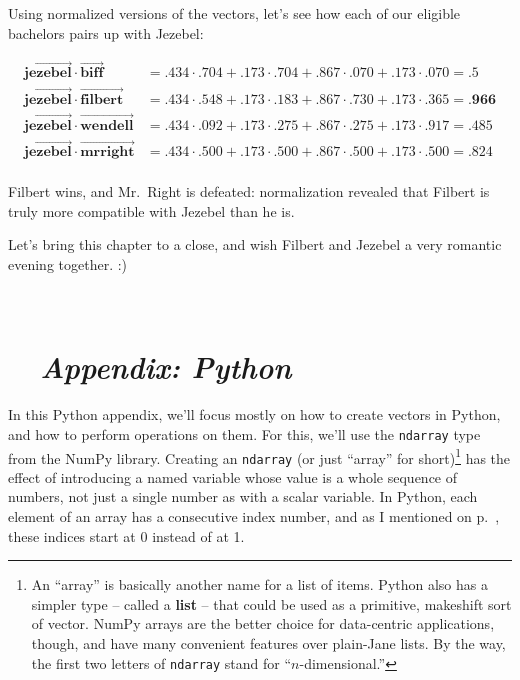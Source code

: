 Using normalized versions of the vectors, let's see how each of our eligible
bachelors pairs up with Jezebel:

\scriptsize
\begin{align*}
\overrightarrow{\textbf{jezebel}} \cdot \overrightarrow{\textbf{biff}} &=
.434 \cdot .704 + .173 \cdot .704 + .867 \cdot .070 + .173 \cdot .070 = .5 \\
\overrightarrow{\textbf{jezebel}} \cdot \overrightarrow{\textbf{filbert}} &=
.434 \cdot .548 + .173 \cdot .183 + .867 \cdot .730  + .173 \cdot .365 =
\textbf{.966} \\
\overrightarrow{\textbf{jezebel}} \cdot \overrightarrow{\textbf{wendell}} &=
.434 \cdot .092 + .173 \cdot .275 + .867 \cdot .275 + .173 \cdot .917 = .485 \\
\overrightarrow{\textbf{jezebel}} \cdot \overrightarrow{\textbf{mrright}} &=
.434 \cdot .500 + .173 \cdot .500 + .867 \cdot .500 + .173 \cdot .500 = .824 \\
\end{align*}

\normalsize
Filbert wins, and Mr.~Right is defeated: normalization revealed that
Filbert is truly more compatible with Jezebel than he is.

\label{matchmakerGameTheSystemEnd}
Let's bring this chapter to a close, and wish Filbert and Jezebel a very
romantic evening together. :)

\hrulefill \\

\vfil\pagebreak

\section*{\faPython \ \ \textit{Appendix: Python}}



In this Python appendix, we'll focus mostly on how to create vectors in Python,
and how to perform operations on them. For this, we'll use the \texttt{ndarray}
type from the NumPy library. Creating an \texttt{ndarray} (or just ``array''
for short)\footnote{An ``array'' is basically another name for a list of items.
Python also has a simpler type -- called a \textbf{list} -- that could be used
as a primitive, makeshift sort of vector. NumPy arrays are the better choice
for data-centric applications, though, and have many convenient features over
plain-Jane lists. By the way, the first two letters of \texttt{ndarray} stand
for ``$n$-dimensional.''} has the effect of introducing a named variable whose
value is a whole sequence of numbers, not just a single number as with a scalar
variable. In Python, each element of an array has a consecutive index number,
and as I mentioned on p.~\pageref{PythonStartsAtZero}, these indices start at 0
instead of at 1.

